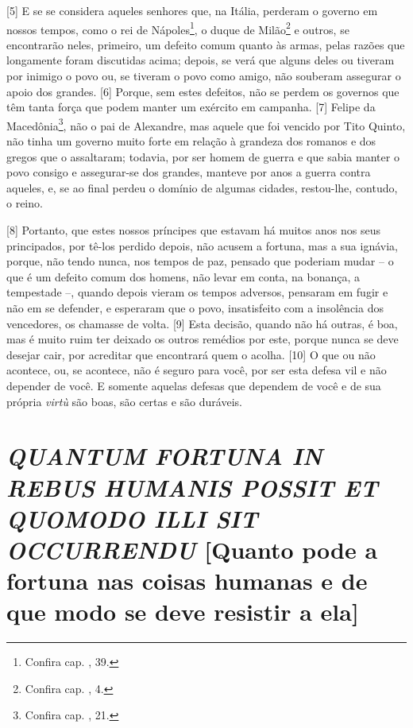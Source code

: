 {[}5{]} E se se considera aqueles senhores que, na Itália, perderam o
governo em nossos tempos, como o rei de Nápoles\footnote{Confira cap.
  , 39.}, o duque de Milão\footnote{Confira cap. , 4.} e outros,
se encontrarão neles, primeiro, um defeito comum quanto às armas, pelas
razões que longamente foram discutidas acima; depois, se verá que alguns
deles ou tiveram por inimigo o povo ou, se tiveram o povo como amigo,
não souberam assegurar o apoio dos grandes. {[}6{]} Porque, sem estes
defeitos, não se perdem os governos que têm tanta força que podem manter
um exército em campanha. {[}7{]} Felipe da Macedônia\footnote{Confira
  cap. , 21.}, não o pai de Alexandre, mas aquele que foi vencido por
Tito Quinto, não tinha um governo muito forte em relação à grandeza dos
romanos e dos gregos que o assaltaram; todavia, por ser homem de guerra
e que sabia manter o povo consigo e assegurar-se dos grandes, manteve
por anos a guerra contra aqueles, e, se ao final perdeu o domínio de
algumas cidades, restou-lhe, contudo, o reino.

{[}8{]} Portanto, que estes nossos príncipes que estavam há muitos anos
nos seus principados, por tê-los perdido depois, não acusem a fortuna,
mas a sua ignávia, porque, não tendo nunca, nos tempos de paz, pensado
que poderiam mudar -- o que é um defeito comum dos homens, não levar em
conta, na bonança, a tempestade --, quando depois vieram os tempos
adversos, pensaram em fugir e não em se defender, e esperaram que o
povo, insatisfeito com a insolência dos vencedores, os chamasse de
volta. {[}9{]} Esta decisão, quando não há outras, é boa, mas é muito
ruim ter deixado os outros remédios por este, porque nunca se deve
desejar cair, por acreditar que encontrará quem o acolha. {[}10{]} O que
ou não acontece, ou, se acontece, não é seguro para você, por ser esta
defesa vil e não depender de você. E somente aquelas defesas que
dependem de você e de sua própria \emph{virtù} são boas, são certas e
são duráveis.

\quebra\section{\emph{QUANTUM FORTUNA IN REBUS HUMANIS POSSIT ET QUOMODO ILLI SIT OCCURRENDU}
{[}Quanto pode a fortuna nas coisas humanas e de que modo se deve resistir a ela{]}}

